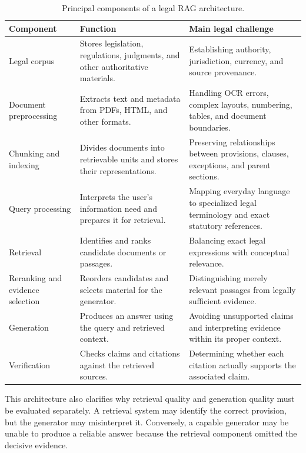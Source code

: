 \begin{table}[tp]
\centering
\caption{Principal components of a legal RAG architecture.}
\label{tab:ragcomp}
\footnotesize
\setlength{\tabcolsep}{5pt}
\renewcommand{\arraystretch}{1.3}
\begin{tabularx}{\textwidth}{>{\raggedright\arraybackslash}p{3.2cm} >{\raggedright\arraybackslash}X >{\raggedright\arraybackslash}X}
\toprule
\textbf{Component} & \textbf{Function} & \textbf{Main legal challenge} \\
\midrule
Legal corpus & Stores legislation, regulations, judgments, and other authoritative materials. & Establishing authority, jurisdiction, currency, and source provenance. \\
Document preprocessing & Extracts text and metadata from PDFs, HTML, and other formats. & Handling OCR errors, complex layouts, numbering, tables, and document boundaries. \\
Chunking and indexing & Divides documents into retrievable units and stores their representations. & Preserving relationships between provisions, clauses, exceptions, and parent sections. \\
Query processing & Interprets the user's information need and prepares it for retrieval. & Mapping everyday language to specialized legal terminology and exact statutory references. \\
Retrieval & Identifies and ranks candidate documents or passages. & Balancing exact legal expressions with conceptual relevance. \\
Reranking and evidence selection & Reorders candidates and selects material for the generator. & Distinguishing merely relevant passages from legally sufficient evidence. \\
Generation & Produces an answer using the query and retrieved context. & Avoiding unsupported claims and interpreting evidence within its proper context. \\
Verification & Checks claims and citations against the retrieved sources. & Determining whether each citation actually supports the associated claim. \\
\bottomrule
\end{tabularx}
\end{table}

This architecture also clarifies why retrieval quality and generation quality must be evaluated
separately. A retrieval system may identify the correct provision, but the generator may misinterpret
it. Conversely, a capable generator may be unable to produce a reliable answer because the retrieval
component omitted the decisive evidence.

